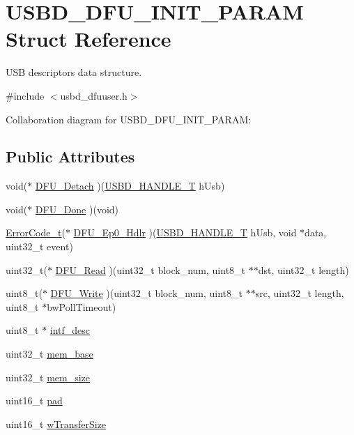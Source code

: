\hypertarget{structUSBD__DFU__INIT__PARAM}{}\section{U\+S\+B\+D\+\_\+\+D\+F\+U\+\_\+\+I\+N\+I\+T\+\_\+\+P\+A\+R\+AM Struct Reference}
\label{structUSBD__DFU__INIT__PARAM}


U\+SB descriptors data structure.  




{\ttfamily \#include $<$usbd\+\_\+dfuuser.\+h$>$}



Collaboration diagram for U\+S\+B\+D\+\_\+\+D\+F\+U\+\_\+\+I\+N\+I\+T\+\_\+\+P\+A\+R\+AM\+:
\subsection*{Public Attributes}
\begin{DoxyCompactItemize}
\item 
void($\ast$ \hyperlink{structUSBD__DFU__INIT__PARAM_ae4467d347854eaab0b352aa5cdef7a74}{D\+F\+U\+\_\+\+Detach} )(\hyperlink{group__USBD__Core_gafdbb2204d929cb9d75736bd2b42342ac}{U\+S\+B\+D\+\_\+\+H\+A\+N\+D\+L\+E\+\_\+T} h\+Usb)
\item 
void($\ast$ \hyperlink{structUSBD__DFU__INIT__PARAM_ace12153364bebed4b022776bcdf4574f}{D\+F\+U\+\_\+\+Done} )(void)
\item 
\hyperlink{error_8h_a905255056c349318139d94aa4523d516}{Error\+Code\+\_\+t}($\ast$ \hyperlink{structUSBD__DFU__INIT__PARAM_a066ab927ae9d87ecac1113648ecb51c6}{D\+F\+U\+\_\+\+Ep0\+\_\+\+Hdlr} )(\hyperlink{group__USBD__Core_gafdbb2204d929cb9d75736bd2b42342ac}{U\+S\+B\+D\+\_\+\+H\+A\+N\+D\+L\+E\+\_\+T} h\+Usb, void $\ast$data, uint32\+\_\+t event)
\item 
uint32\+\_\+t($\ast$ \hyperlink{structUSBD__DFU__INIT__PARAM_adb7678f56abeefa8d1169fe85a66d474}{D\+F\+U\+\_\+\+Read} )(uint32\+\_\+t block\+\_\+num, uint8\+\_\+t $\ast$$\ast$dst, uint32\+\_\+t length)
\item 
uint8\+\_\+t($\ast$ \hyperlink{structUSBD__DFU__INIT__PARAM_abefbfdbb6f1154eb736f539782745b3e}{D\+F\+U\+\_\+\+Write} )(uint32\+\_\+t block\+\_\+num, uint8\+\_\+t $\ast$$\ast$src, uint32\+\_\+t length, uint8\+\_\+t $\ast$bw\+Poll\+Timeout)
\item 
uint8\+\_\+t $\ast$ \hyperlink{structUSBD__DFU__INIT__PARAM_ac124783c4a9188405cdb87399aa067ce}{intf\+\_\+desc}
\item 
uint32\+\_\+t \hyperlink{structUSBD__DFU__INIT__PARAM_a00d172e271b0f2272b052f479c3d2439}{mem\+\_\+base}
\item 
uint32\+\_\+t \hyperlink{structUSBD__DFU__INIT__PARAM_a4624ef53dbdf39e27314fa7b19d6720d}{mem\+\_\+size}
\item 
uint16\+\_\+t \hyperlink{structUSBD__DFU__INIT__PARAM_a12378565018adc1588b6fd4f12e3a5dc}{pad}
\item 
uint16\+\_\+t \hyperlink{structUSBD__DFU__INIT__PARAM_a497bbbfa6751823b9e288c257456b56f}{w\+Transfer\+Size}
\end{DoxyCompactItemize}


